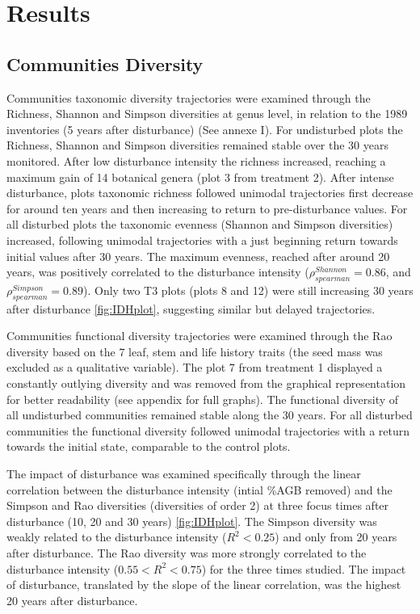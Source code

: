 \documentclass[fleqn,10pt]{ArtEcoFoG} %
\theoremstyle{definition}
\theoremstyle{definition}
\theoremstyle{definition}
\theoremstyle{remark}
\begin{document}
\section{Results}\label{results}

\subsection{Communities Diversity}\label{communities-diversity}

Communities taxonomic diversity trajectories were examined through the
Richness, Shannon and Simpson diversities at genus level, in relation to
the 1989 inventories (5 years after disturbance) (See annexe I). For
undisturbed plots the Richness, Shannon and Simpson diversities remained
stable over the 30 years monitored. After low disturbance intensity the
richness increased, reaching a maximum gain of 14 botanical genera (plot
3 from treatment 2). After intense disturbance, plots taxonomic richness
followed unimodal trajectories first decrease for around ten years and
then increasing to return to pre-disturbance values. For all disturbed
plots the taxonomic evenness (Shannon and Simpson diversities)
increased, following unimodal trajectories with a just beginning return
towards initial values after 30 years. The maximum evenness, reached
after around 20 years, was positively correlated to the disturbance
intensity (\(\rho_{spearman}^{Shannon}=0.86\), and
\(\rho_{spearman}^{Simpson}=0.89\)). Only two T3 plots (plots 8 and 12)
were still increasing 30 years after disturbance \ref{fig:IDHplot},
suggesting similar but delayed trajectories.

Communities functional diversity trajectories were examined through the
Rao diversity based on the 7 leaf, stem and life history traits (the
seed mass was excluded as a qualitative variable). The plot 7 from
treatment 1 displayed a constantly outlying diversity and was removed
from the graphical representation for better readability (see appendix
for full graphs). The functional diversity of all undisturbed
communities remained stable along the 30 years. For all disturbed
communities the functional diversity followed unimodal trajectories with
a return towards the initial state, comparable to the control plots.

The impact of disturbance was examined specifically through the linear
correlation between the disturbance intensity (intial \%AGB removed) and
the Simpson and Rao diversities (diversities of order 2) at three focus
times after disturbance (10, 20 and 30 years) \ref{fig:IDHplot}. The
Simpson diversity was weakly related to the disturbance intensity
(\(R^2<0.25\)) and only from 20 years after disturbance. The Rao
diversity was more strongly correlated to the disturbance intensity
(\(0.55<R^2<0.75\)) for the three times studied. The impact of
disturbance, translated by the slope of the linear correlation, was the
highest 20 years after disturbance.
\end{document}
